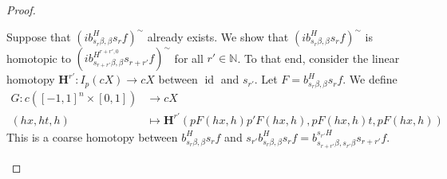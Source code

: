 \documentclass[a4paper,11pt]{article}
\theoremstyle{definition}
\theoremstyle{plain}
\theoremstyle{remark}
\DeclareMathOperator{\id}{id}
\begin{document}
{\begin{proof}
\begin{enumerate}
 Suppose that $(ib^H_{s_{r}\beta,\beta}s_{r}f)^{\sim}$ already exists. We show that $(ib^H_{s_{r}\beta,\beta}s_{r}f)^{\sim}$ is homotopic to $(ib^{H^{r+r',0}}_{s_{r+r'}\beta,\beta}s_{r+r'}f)^{\sim}$ for all $r'\in \mathbb{N}$. To that end, consider the linear homotopy $\mathbf{H}^{r'}: I_{p}(cX)\rightarrow cX$ between $\id$ and $s_{r'}$. Let $F=b^H_{s_{r}\beta,\beta}s_{r}f$. We define
\begin{align*}
G: c([-1,1]^n \times [0,1])&\rightarrow cX\\
(hx,ht,h)&\mapsto \mathbf{H}^{r'}(pF(hx,h) p'F(hx,h), pF(hx,h)t, pF(hx,h)) 
\end{align*} 
This is a coarse homotopy between $b^H_{s_{r}\beta,\beta}s_{r}f$ and $s_{r'}b^H_{s_{r}\beta,\beta}s_{r}f =b^{s_{r'}H}_{s_{r+r'}\beta,s_{r'}\beta}s_{r+r'}f $.\\


\end{enumerate}
\end{proof}}
\end{document}

